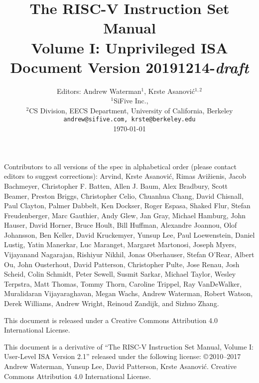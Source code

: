 \documentclass[twoside,11pt]{book}
\newcommand{\specrev}{\mbox{20191214-{\em draft}}}
\begin{document}
\title{\vspace{-0.7in}\Large {\bf The RISC-V Instruction Set Manual} \\
  \large {\bf Volume I: Unprivileged ISA} \\
  Document Version \specrev
  \vspace{-0.1in}}

\author{Editors: Andrew Waterman$^{1}$, Krste Asanovi\'{c}$^{1,2}$ \\
  $^{1}$SiFive Inc., \\
  $^{2}$CS Division, EECS Department, University of California, Berkeley \\
  {\tt andrew@sifive.com, krste@berkeley.edu} \\
  \today
}
\date{} 
\maketitle

Contributors to all versions of the spec in
alphabetical order (please contact editors to suggest
corrections):
Arvind, Krste Asanovi\'{c}, Rimas Avi\v{z}ienis, Jacob Bachmeyer, Christopher
F. Batten, Allen J. Baum, Alex Bradbury, Scott Beamer, Preston Briggs,
Christopher Celio, Chuanhua Chang, David Chisnall, Paul Clayton, Palmer
Dabbelt, Ken Dockser, Roger Espasa, Shaked Flur, Stefan Freudenberger,
Marc Gauthier, Andy Glew, Jan Gray, Michael Hamburg,
John Hauser, David Horner, Bruce Hoult, Bill Huffman, Alexandre Joannou,
Olof Johansson, Ben Keller, David Kruckemyer, Yunsup Lee,
Paul Loewenstein, Daniel Lustig, Yatin Manerkar, Luc Maranget, Margaret
Martonosi, Joseph Myers, Vijayanand Nagarajan, Rishiyur Nikhil, Jonas
Oberhauser, Stefan O'Rear, Albert Ou, John Ousterhout, David Patterson,
Christopher Pulte, Jose Renau, Josh Scheid, Colin Schmidt, Peter Sewell, Susmit Sarkar,
Michael Taylor, Wesley Terpstra, Matt Thomas, Tommy Thorn, Caroline Trippel,
Ray VanDeWalker, Muralidaran Vijayaraghavan, Megan Wachs, Andrew Waterman,
Robert Watson, Derek Williams, Andrew Wright, Reinoud Zandijk, and Sizhuo
Zhang.

This document is released under a Creative Commons Attribution 4.0
International License.

This document is a derivative of ``The RISC-V Instruction Set
Manual, Volume I: User-Level ISA Version 2.1'' released under the following license:
\copyright \,2010--2017 Andrew Waterman, Yunsup Lee, David Patterson, Krste Asanovi\'{c}. 
Creative Commons Attribution 4.0 International License.
\end{document}
